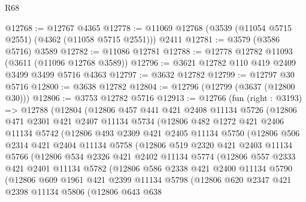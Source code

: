 \begin{lexlean}{R68}
\begin{coremodule}
@12768 := @12767 @4365
@12778 := @11069 @12768 (@3539 (@11054 @5715 @2551) (@4362 (@11058 @5715 @2551))) @2411
@12781 := @3579 (@3586 @5716) @3589
@12782 := @11086 @12781
@12788 := @12778 @12782 @11093 (@3611 (@11096 @12768 @3589))
@12796 := @3621 @12782 @110 @419 @2409 @3499 @3499 @5716 @4363
@12797 := @3632 @12782
@12799 := @12797 @30 @5716
@12800 := @3638 @12782
@12804 := @12796 (@12799 (@3637 (@12800 @30)))
@12806 := @3753 @12782 @5716
@12913 := @12766
    (fun (right : @3193) =>
    @12788
      (@12804
        (@12806
          @457
          @441
          @421
          @2408
          @11134
          @5726
          (@12806
            @471
            @2301
            @421
            @2407
            @11134
            @5734
            (@12806
              @482
              @1272
              @421
              @2406
              @11134
              @5742
              (@12806
                @493
                @2309
                @421
                @2405
                @11134
                @5750
                (@12806
                  @506
                  @2314
                  @421
                  @2404
                  @11134
                  @5758
                  (@12806
                    @519
                    @2320
                    @421
                    @2403
                    @11134
                    @5766
                    (@12806
                      @534
                      @2326
                      @421
                      @2402
                      @11134
                      @5774
                      (@12806
                        @557
                        @2333
                        @421
                        @2401
                        @11134
                        @5782
                        (@12806
                          @586
                          @2338
                          @421
                          @2400
                          @11134
                          @5790
                          (@12806
                            @609
                            @1961
                            @421
                            @2399
                            @11134
                            @5798
                            (@12806
                              @620
                              @2347
                              @421
                              @2398
                              @11134
                              @5806
                              (@12806
                                @643
                                @638

\end{coremodule}
\end{lexlean}
